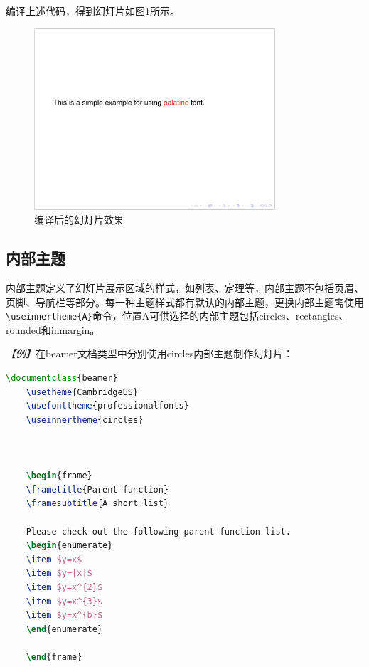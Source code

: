 编译上述代码，得到幻灯片如图\ref{fig:929}所示。

\begin{figure}[htbp]
    \centering
    \includegraphics[width = 0.8\textwidth]{images/ch_9/example_sec2_4.png}
    \caption{编译后的幻灯片效果}
    \label{fig:929}
\end{figure}

\subsection{内部主题}

内部主题定义了幻灯片展示区域的样式，如列表、定理等，内部主题不包括页眉、页脚、导航栏等部分。每一种主题样式都有默认的内部主题，更换内部主题需使用\texttt{\textbackslash{}useinnertheme\{A\}}命令，位置A可供选择的内部主题包括circles、rectangles、rounded和inmargin。

\emph{【例】}在beamer文档类型中分别使用circles内部主题制作幻灯片：
\begin{lstlisting}[language=TeX]
    \documentclass{beamer}
    \usetheme{CambridgeUS}
    \usefonttheme{professionalfonts}
    \useinnertheme{circles}

    

    \begin{frame}
    \frametitle{Parent function}
    \framesubtitle{A short list}

    Please check out the following parent function list.
    \begin{enumerate}
    \item $y=x$
    \item $y=|x|$
    \item $y=x^{2}$
    \item $y=x^{3}$
    \item $y=x^{b}$
    \end{enumerate}

    \end{frame}

    
\end{lstlisting}

